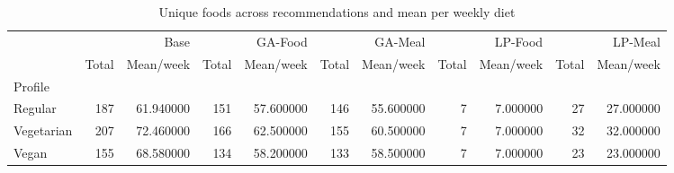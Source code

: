 \begin{table}
\caption{Unique foods across recommendations and mean per weekly diet}
\label{tab:diversity}
\begin{tabular}{lrrrrrrrrrr}
\toprule
 & \multicolumn{2}{r}{Base} & \multicolumn{2}{r}{GA-Food} & \multicolumn{2}{r}{GA-Meal} & \multicolumn{2}{r}{LP-Food} & \multicolumn{2}{r}{LP-Meal} \\
 & Total & Mean/week & Total & Mean/week & Total & Mean/week & Total & Mean/week & Total & Mean/week \\
Profile &  &  &  &  &  &  &  &  &  &  \\
\midrule
Regular & 187 & 61.940000 & 151 & 57.600000 & 146 & 55.600000 & 7 & 7.000000 & 27 & 27.000000 \\
Vegetarian & 207 & 72.460000 & 166 & 62.500000 & 155 & 60.500000 & 7 & 7.000000 & 32 & 32.000000 \\
Vegan & 155 & 68.580000 & 134 & 58.200000 & 133 & 58.500000 & 7 & 7.000000 & 23 & 23.000000 \\
\bottomrule
\end{tabular}
\end{table}
